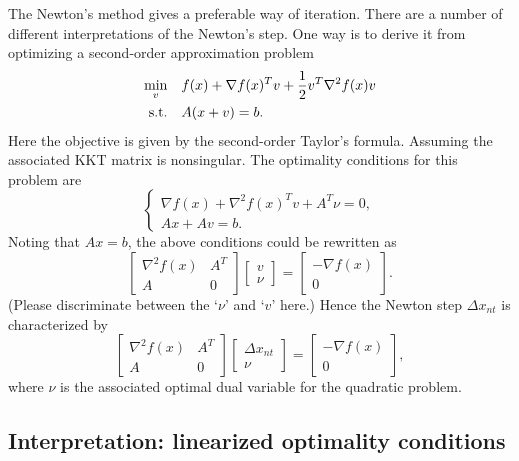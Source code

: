 \documentclass[12pt]{article}
\begin{document}
The Newton's method gives a preferable way of iteration. There are a number of different interpretations of the Newton's step. One way is to derive it from optimizing a second-order approximation problem
\[\begin{aligned}
    \min_v\quad & f(x)+\nabla f(x)^Tv+\frac12v^T\nabla^2f(x)v\\
    \textnormal{s.t.}\quad & A(x+v)=b.
\end{aligned}\]
Here the objective is given by the second-order Taylor's formula. Assuming the associated KKT matrix is nonsingular. The optimality conditions for this problem are
\[\begin{cases}
    \nabla f(x)+\nabla^2f(x)^Tv+A^T\nu=0,\\
    Ax+Av=b.
\end{cases}\]
Noting that \(Ax=b\), the above conditions could be rewritten as
\[\begin{bmatrix}
    \nabla^2f(x) & A^T \\ A & 0
\end{bmatrix}\begin{bmatrix}
    v \\ \nu
\end{bmatrix}=\begin{bmatrix}
    -\nabla f(x) \\ 0
\end{bmatrix}.\]
(Please discriminate between the `\(\nu\)' and `\(v\)' here.) Hence the Newton step \(\Delta x_{nt}\) is characterized by
\[\begin{bmatrix}
    \nabla^2f(x) & A^T \\ A & 0
\end{bmatrix}\begin{bmatrix}
    \Delta x_{nt} \\ \nu
\end{bmatrix}=\begin{bmatrix}
    -\nabla f(x) \\ 0
\end{bmatrix},\]
where \(\nu\) is the associated optimal dual variable for the quadratic problem.

\subsection{Interpretation: linearized optimality conditions}
\end{document}
